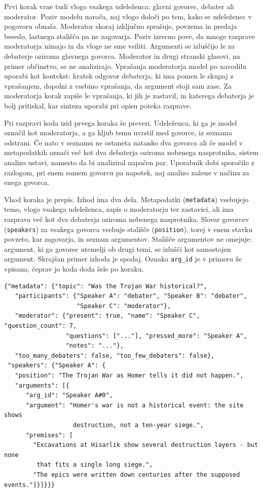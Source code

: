 \documentclass[a4paper, 12pt]{book}
\begin{document}
Prvi korak vrne tudi vlogo vsakega udeleženca: glavni govorec, debater ali moderator. Poziv modelu naroča, naj vlogo določi po tem, kako se udeleženec v pogovoru obnaša. Moderator skoraj izključno sprašuje, povzema in predaja besedo, lastnega stališča pa ne zagovarja. Poziv izrecno pove, da mnoge razprave moderatorja nimajo in da vloge ne sme vsiliti. Argumenti se izluščijo le za debaterje oziroma glavnega govorca. Moderator in drugi stranski glasovi, na primer občinstvo, se ne analizirajo. Vprašanja moderatorja model po navodilu uporabi kot kontekst: kratek odgovor debaterja, ki ima pomen le skupaj z vprašanjem, dopolni z vsebino vprašanja, da argument stoji sam zase. Za moderatorja korak zapiše le vprašanja, ki jih je zastavil, in katerega debaterja je bolj pritiskal, kar sinteza uporabi pri opisu poteka razprave.

Pri razpravi koda izid prvega koraka še preveri. Udeleženca, ki ga je model označil kot moderatorja, a ga kljub temu uvrstil med govorce, iz seznama odstrani. Če nato v seznamu ne ostaneta natanko dva govorca ali če model v metapodatkih označi več kot dva debaterja oziroma nobenega nasprotnika, sistem analizo ustavi, namesto da bi analiziral napačen par. Uporabnik dobi sporočilo z razlogom, pri enem samem govorcu pa napotek, naj analizo zažene v načinu za enega govorca.

Vhod koraka je prepis. Izhod ima dva dela. Metapodatki (\texttt{metadata}) vsebujejo temo, vlogo vsakega udeleženca, zapis o moderatorju ter zastavici, ali ima razprava več kot dva debaterja oziroma nobenega nasprotnika. Slovar govorcev (\texttt{speakers}) za vsakega govorca vsebuje stališče (\texttt{position}), torej v enem stavku povzeto, kar zagovarja, in seznam argumentov. Stališče argumentov ne omejuje: argument, ki ga govorec utemelji ob drugi temi, se izlušči kot samostojen argument. Skrajšan primer izhoda je spodaj. Oznaka \texttt{arg\_id} je v primeru že vpisana, čeprav jo koda doda šele po koraku.

\begin{lstlisting}[basicstyle=\ttfamily\scriptsize,breaklines=true]
{"metadata": {"topic": "Was the Trojan War historical?",
   "participants": {"Speaker A": "debater", "Speaker B": "debater",
                    "Speaker C": "moderator"},
   "moderator": {"present": true, "name": "Speaker C", "question_count": 7,
                 "questions": ["..."], "pressed_more": "Speaker A",
                 "notes": "..."},
   "too_many_debaters": false, "too_few_debaters": false},
 "speakers": {"Speaker A": {
   "position": "The Trojan War as Homer tells it did not happen.",
   "arguments": [{
      "arg_id": "Speaker A#0",
      "argument": "Homer's war is not a historical event: the site shows
                   destruction, not a ten-year siege.",
      "premises": [
        "Excavations at Hisarlik show several destruction layers - but none
         that fits a single long siege.",
        "The epics were written down centuries after the supposed events."]}]}}}
\end{lstlisting}
\end{document}
